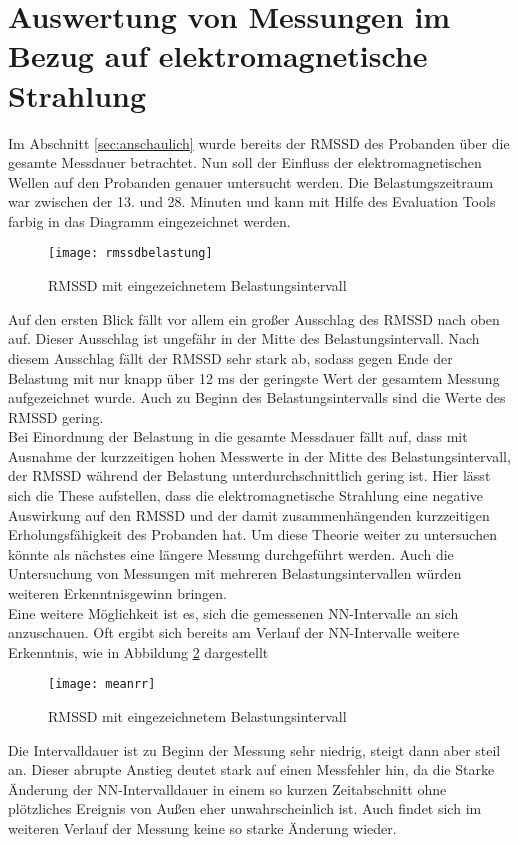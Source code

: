 \section{Auswertung von Messungen im Bezug auf elektromagnetische Strahlung}
Im Abschnitt \ref{sec:anschaulich} wurde bereits der RMSSD des Probanden über die gesamte Messdauer betrachtet. Nun soll der Einfluss der elektromagnetischen Wellen auf den Probanden genauer untersucht werden. Die Belastungszeitraum war zwischen der 13. und 28. Minuten und kann mit Hilfe des Evaluation Tools farbig in das Diagramm eingezeichnet werden.
\begin{figure}[H]
	\centering
	\texttt{[image: rmssdbelastung]}
	\caption{RMSSD mit eingezeichnetem Belastungsintervall }
	\label{fig:rmssdbelastung}
\end{figure}
Auf den ersten Blick fällt vor allem ein großer Ausschlag des RMSSD nach oben auf. Dieser Ausschlag ist ungefähr in der Mitte des Belastungsintervall. Nach diesem Ausschlag fällt der RMSSD sehr stark ab, sodass gegen Ende der Belastung mit nur knapp über 12 ms der geringste Wert der gesamtem Messung aufgezeichnet wurde. Auch zu Beginn des Belastungsintervalls sind die Werte des RMSSD gering. \\
Bei Einordnung der Belastung in die gesamte Messdauer fällt auf, dass mit Ausnahme der kurzzeitigen hohen Messwerte in der Mitte des Belastungsintervall, der RMSSD während der Belastung unterdurchschnittlich gering ist. Hier lässt sich die These aufstellen, dass die elektromagnetische Strahlung eine negative Auswirkung auf den RMSSD und der damit zusammenhängenden kurzzeitigen Erholungsfähigkeit des Probanden hat. Um diese Theorie weiter zu untersuchen könnte als nächstes eine längere Messung durchgeführt werden. Auch die Untersuchung von Messungen mit mehreren Belastungsintervallen würden weiteren Erkenntnisgewinn bringen. \\
Eine weitere Möglichkeit ist es, sich die gemessenen NN-Intervalle an sich anzuschauen. Oft ergibt sich bereits am Verlauf der NN-Intervalle weitere Erkenntnis, wie in Abbildung \ref{fig:meanrr} dargestellt
\begin{figure}[H]
	\centering
	\texttt{[image: meanrr]}
	\caption{RMSSD mit eingezeichnetem Belastungsintervall }
	\label{fig:meanrr}
\end{figure}

Die Intervalldauer ist zu Beginn der Messung sehr niedrig, steigt dann aber steil an. Dieser abrupte Anstieg deutet stark auf einen Messfehler hin, da die Starke Änderung der NN-Intervalldauer in einem so kurzen Zeitabschnitt ohne plötzliches Ereignis von Außen eher unwahrscheinlich ist. Auch findet sich im weiteren Verlauf der Messung keine so starke Änderung wieder.\\

